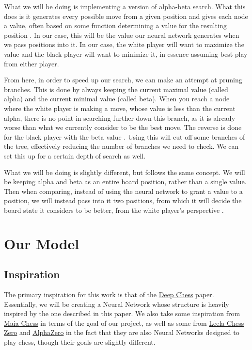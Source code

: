 \documentclass[12pt]{article}
\begin{document}
    What we will be doing is implementing a version of alpha-beta search. What this does is it generates every possible move from a given position and gives each node a value, often based on some function determining a value for the resulting position \cite{alphabeta_montecarlo}. In our case, this will be the value our neural network generates when we pass positions into it. In our case, the white player will want to maximize the value and the black player will want to minimize it, in essence assuming best play from either player. 

    From here, in order to speed up our search, we can make an attempt at pruning branches. This is done by always keeping the current maximal value (called alpha) and the current minimal value (called beta). When you reach a node where the white player is making a move, whose value is less than the current alpha, there is no point in searching further down this branch, as it is already worse than what we currently consider to be the best move. The reverse is done for the black player with the beta value \cite{deepchess}\cite{alphabeta_montecarlo}. Using this will cut off some branches of the tree, effectively reducing the number of branches we need to check. We can set this up for a certain depth of search as well.

    What we will be doing is slightly different, but follows the same concept. We will be keeping alpha and beta as an entire board position, rather than a single value. Then when comparing, instead of using the neural network to grant a value to a position, we will instead pass into it two positions, from which it will decide the board state it considers to be better, from the white player's perspective \cite{deepchess}.
    
    \section{Our Model}

    \subsection{Inspiration}

    The primary inspiration for this work is that of the \href{http://dx.doi.org/10.1007/978-3-319-44781-0_11}{Deep Chess} paper. Essentially, we will be creating a Neural Network whose structure is heavily inspired by the one described in this paper. We also take some inspiration from \href{https://doi.org/10.1145/3394486.3403219}{Maia Chess} in terms of the goal of our project, as well as some from \href{https://github.com/LeelaChessZero/lc0}{Leela Chess Zero} and \href{https://arxiv.org/abs/1712.01815}{AlphaZero} in the fact that they are also Neural Networks designed to play chess, though their goals are slightly different. 
\end{document}
